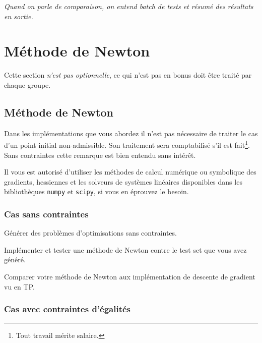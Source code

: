 \documentclass[11pt, a4paper]{article}
\begin{document}
\vspace{\baselineskip}
\noindent \emph{Quand on parle de comparaison, on entend batch de
  tests et résumé des résultats en sortie.}

\section{Méthode de Newton}

Cette section \emph{n'est pas optionnelle}, ce qui n'est pas en bonus
doit être traité par chaque groupe.

\subsection{Méthode de Newton}

Dans les implémentations que vous abordez il n'est pas nécessaire de
traiter le cas d'un point initial non-admissible. Son traitement sera
comptabilisé s'il est fait\footnote{Tout travail mérite
  salaire.}. Sans contraintes cette remarque est bien entendu sans
intérêt.

Il vous est autorisé d'utiliser les méthodes de calcul numérique ou
symbolique des gradients, hessiennes et les solveurs de systèmes
linéaires disponibles dans les bibliothèques \texttt{numpy} et
\texttt{scipy}, si vous en éprouvez le besoin.

\subsubsection{Cas sans contraintes}

\begin{question}
  Générer des problèmes d'optimisations sans contraintes.
\end{question}

\begin{question}
  Implémenter et tester une méthode de Newton contre le test set que
  vous avez généré.
\end{question}

\begin{question}
  Comparer votre méthode de Newton aux implémentation de descente de
  gradient vu en TP.
\end{question}

\subsubsection{Cas avec contraintes d'égalités}
\end{document}
